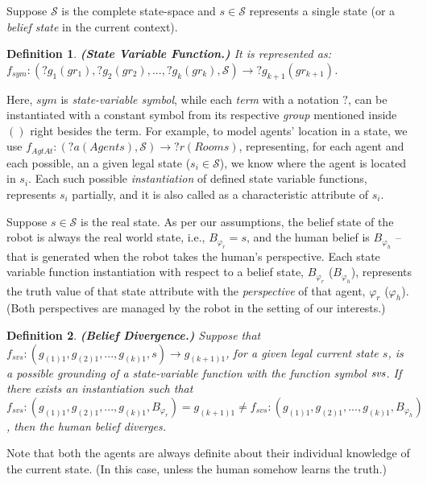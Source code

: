 \documentclass[letterpaper]{article} %
\newtheorem{definition}{Definition}
\begin{document}
Suppose $\mathcal{S}$ is the complete state-space and $s \in \mathcal{S}$ represents a single state (or a \textit{belief state} in the current context).  


\begin{definition}
\textbf{(State Variable Function.)} It is represented as: $f_{sym}:(?g_1 (gr_1), ?g_2 (gr_2), ..., ?g_k (gr_k),\mathcal{S})\rightarrow ?g_{k+1} (gr_{k+1})$. 
\end{definition}
Here, $sym$ is \textit{state-variable symbol}, while each \textit{term} with a notation $?$, can be instantiated with a constant symbol from its respective \textit{group} mentioned inside $()$ right besides the term. 
For example, to model agents' location in a state, we use $f_{AgtAt}:(?a (Agents), \mathcal{S}) \rightarrow ?r (Rooms)$, representing, for each agent and each possible, an a given legal state ($s_i \in \mathcal{S}$), we know where the agent is located in $s_i$. 
Each such possible \textit{instantiation} of defined state variable functions, represents $s_i$ partially, and it is also called as a characteristic attribute of $s_i$.     
 
Suppose $s \in \mathcal{S}$ is the real state. As per our assumptions, the belief state of the robot is always the real world state, i.e., $B_{\varphi_r} = s$, and the human belief is $B_{\varphi_h}$ -- that is generated when the robot takes the human's perspective. Each state variable function instantiation with respect to a belief state, $B_{\varphi_r}$ ($B_{\varphi_h}$), represents the truth value of that state attribute with the \textit{perspective} of that agent, $\varphi_r$ ($\varphi_h$). (Both perspectives are managed by the robot in the setting of our interests.) 

\begin{definition}
\textbf{(Belief Divergence.)}
Suppose that $f_{\textit{svs}}:(g_{(1)1},g_{(2)1},...,g_{(k)1},s)\rightarrow g_{(k+1)1}$, for a given legal current state $s$, is a possible {\em grounding} of a state-variable function with the function symbol $\text{\em svs}$. 
If there exists an instantiation such that $f_{\textit{svs}}:(g_{(1)1},g_{(2)1},...,g_{(k)1},B_{\varphi_r}) = {g_{(k+1)1}}  \neq f_{\textit{svs}}:(g_{(1)1},g_{(2)1},...,g_{(k)1},B_{\varphi_h})$, then the human belief diverges.  
\end{definition} 
Note that both the agents are always definite about their individual knowledge of the current state. (In this case, unless the human somehow learns the truth.)
\end{document}
